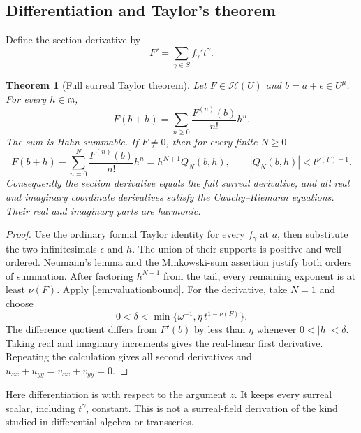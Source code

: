 \documentclass[11pt,oneside]{article}
\numberwithin{equation}{section}
\newtheorem{theorem}{Theorem}[section]
\theoremstyle{definition}
\theoremstyle{remark}\newtheorem{remark}[theorem]{Remark}
\newcommand{\HH}{\mathscr H}
\newcommand{\m}{\mathfrak m}
\begin{document}
\subsection{Differentiation and Taylor's theorem}
Define the section derivative by
\[
 F'=\sum_{\gamma\in S}f_\gamma't^\gamma.
\]
\begin{theorem}[Full surreal Taylor theorem]\label{thm:taylor}
Let $F\in\HH(U)$ and $b=a+\epsilon\in U^\mu$. For every $h\in\m$,
\begin{equation}\label{eq:TaylorH}
 F(b+h)=\sum_{n\geq0}\frac{F^{(n)}(b)}{n!}h^n.
\end{equation}
The sum is Hahn summable. If $F\ne0$, then for every finite $N\geq0$
\begin{equation}\label{eq:remainder}
 F(b+h)-\sum_{n=0}^N\frac{F^{(n)}(b)}{n!}h^n
   =h^{N+1}Q_N(b,h),\qquad
 |Q_N(b,h)|<t^{\nu(F)-1}.
\end{equation}
Consequently the section derivative equals the full surreal derivative,
and all real and imaginary coordinate derivatives satisfy the
Cauchy--Riemann equations. Their real and imaginary parts are harmonic.
\end{theorem}
\begin{proof}
Use the ordinary formal Taylor identity for every $f_\gamma$ at $a$,
then substitute the two infinitesimals $\epsilon$ and $h$. The union of
their supports is positive and well ordered. Neumann's lemma and the
Minkowski-sum assertion justify both orders of summation. After factoring
$h^{N+1}$ from the tail, every remaining exponent is at least $\nu(F)$.
Apply \cref{lem:valuationbound}. For the derivative, take $N=1$ and choose
\[
 0<\delta<\min\{\omega^{-1},\eta\,t^{1-\nu(F)}\}.
\]
The difference quotient differs from $F'(b)$ by less than $\eta$ whenever
$0<|h|<\delta$. Taking real and imaginary increments gives the real-linear
first derivative. Repeating the calculation gives all second derivatives
and $u_{xx}+u_{yy}=v_{xx}+v_{yy}=0$.
\end{proof}
Here differentiation is with respect to the argument $z$. It keeps every
surreal scalar, including $t^\gamma$, constant. This is not a surreal-field
derivation of the kind studied in differential algebra or transseries.
\end{document}

